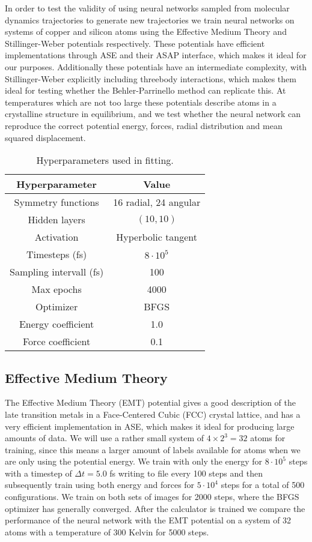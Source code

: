 In order to test the validity of using neural networks sampled
from molecular dynamics trajectories to generate new trajectories
we train neural networks on systems of copper and silicon atoms
using the Effective Medium Theory and Stillinger-Weber potentials
respectively. These potentials have efficient implementations
through ASE and their ASAP interface, which makes
it ideal for our purposes. Additionally these potentials
have an intermediate complexity, with Stillinger-Weber explicitly
including threebody interactions, which makes them ideal
for testing whether the Behler-Parrinello method can replicate this.
At temperatures which are not too large these potentials describe
atoms in a crystalline structure in equilibrium,
and we test whether the neural network can reproduce the correct potential
energy, forces, radial distribution and mean squared displacement.

\begin{table}[h]
\label{tab:hyperparam}
\caption{Hyperparameters used in fitting.}
\begin{center}
\begin{tabular}{|c c|}
\hline
Hyperparameter & Value \\
\hline \hline
Symmetry functions & 16 radial, 24 angular \\
    Hidden layers & $(10, 10)$ \\
Activation & Hyperbolic tangent \\
    Timesteps (fs) & $8 \cdot 10^5$ \\
    Sampling intervall (fs) & 100 \\
Max epochs & 4000 \\
Optimizer & BFGS \\
Energy coefficient & 1.0 \\
Force coefficient & 0.1 \\
\hline
\end{tabular}
\end{center}
\end{table}

\subsection{Effective Medium Theory}
The Effective Medium Theory (EMT) potential gives a good description
of the late transition metals in a Face-Centered Cubic (FCC) crystal
lattice, and has a very efficient implementation in ASE,
which makes it ideal for producing large amounts of data.
We will use a rather small system of $4 \times 2^3 = 32$ atoms
for training, since this means a larger amount of labels available
for atoms when we are only using the potential energy.
We train with only the energy for $8 \cdot 10^5$ steps
with a timestep of $\Delta t = 5.0$ fs
writing to file every 100 steps and then subsequently
train using both energy and forces for $5 \cdot 10^4$ steps
for a total of 500 configurations. We train on both sets of images
for 2000 steps, where the BFGS optimizer has generally converged.
After the calculator is trained we compare the performance
of the neural network with the EMT potential on a system
of 32 atoms with a temperature of 300 Kelvin for 5000 steps.

